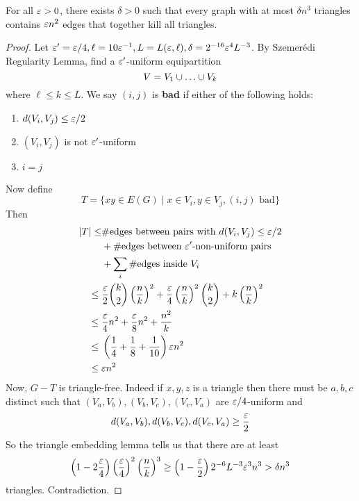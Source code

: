 \documentclass{article}
\begin{document}
\begin{lem}
  For all $\varepsilon > 0$, there exists $\delta > 0$ such that every graph with at most $\delta n^3$ triangles contains $\varepsilon n^2$ edges that together kill all triangles.
\end{lem}
\begin{proof}
  Let $\varepsilon' = \varepsilon/4, \ell = 10\varepsilon^{-1}, L = L(\varepsilon, \ell), \delta = 2^{-16}\varepsilon^4L^{-3}$. By Szemerédi Regularity Lemma, find a $\varepsilon'$-uniform equipartition
  $$V = V_1 \union \dots \union V_k$$
  where $\ell \le k \le L$. We say $(i, j)$ is {\bf bad} if either of the following holds:
  \begin{enumerate}
    \item $d(V_i, V_j) \le \varepsilon/2$
    \item $(V_i, V_j)$ is not $\varepsilon'$-uniform
    \item $i = j$
  \end{enumerate}
  Now define
  $$T = \{xy \in E(G) \mid x \in V_i, y \in V_j, (i, j) \text{ bad}\}$$
  Then
  \begin{align*}
    \left\lvert T\right\rvert \le
    & \#\text{edges between pairs with } d(V_i, V_j) \le \varepsilon/2 \\
    & + \#\text{edges between $\varepsilon'$-non-uniform pairs} \\
    & + \sum_i \#\text{edges inside } V_i \\
    \le{} & \frac{\varepsilon} 2 \binom k2 \left(\frac nk\right)^2 + \frac{\varepsilon} 4 \left(\frac nk\right)^2 \binom k2 + k\left(\frac nk\right)^2 \\
    \le{} & \frac{\varepsilon} 4 n^2 + \frac{\varepsilon} 8 n^2 + \frac{n^2}k \\
    \le{} & \left(\frac 14 + \frac 18 + \frac 1{10}\right)\varepsilon n^2 \\
    \le{} & \varepsilon n^2
  \end{align*}
  Now, $G - T$ is triangle-free. Indeed if $x, y, z$ is a triangle then there must be $a, b, c$ distinct such that $(V_a, V_b), (V_b, V_c), (V_c, V_a)$ are $\varepsilon/4$-uniform and
  $$d(V_a, V_b), d(V_b, V_c), d(V_c, V_a) \ge \frac{\varepsilon} 2$$
  So the triangle embedding lemma tells us that there are at least
  $$\left(1 - 2 \frac{\varepsilon} 4\right) \left(\frac{\varepsilon} 4\right)^2 \left(\frac nk\right)^3 \ge \left(1 - \frac{\varepsilon} 2\right)2^{-6}L^{-3}\varepsilon^3n^3 > \delta n^3$$
  triangles. Contradiction.
\end{proof}

\newlec
\end{document}
